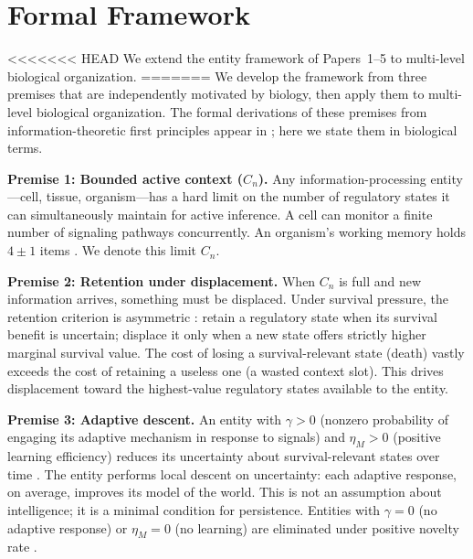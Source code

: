 \documentclass[11pt]{article}
\theoremstyle{definition}
\theoremstyle{remark}
\begin{document}
\section{Formal Framework}
\label{sec:framework}

<<<<<<< HEAD
We extend the entity framework of Papers~1--5 to multi-level
biological organization.
=======
We develop the framework from three premises that are independently
motivated by biology, then apply them to multi-level biological
organization. The formal derivations of these premises from
information-theoretic first principles appear in
\cite{McCarthy2026a, McCarthy2026b, McCarthy2026c, McCarthy2026d};
here we state them in biological terms.

\textbf{Premise 1: Bounded active context ($C_n$).}
Any information-processing entity---cell, tissue, organism---has a
hard limit on the number of regulatory states it can simultaneously
maintain for active inference. A cell can monitor a finite number of
signaling pathways concurrently. An organism's working memory holds
$4 \pm 1$ items \cite{Cowan2001}. We denote this limit $C_n$.

\textbf{Premise 2: Retention under displacement.}
When $C_n$ is full and new information arrives, something must be
displaced. Under survival pressure, the retention criterion is
asymmetric \cite{McCarthy2026c}: retain a regulatory state when its
survival benefit is uncertain; displace it only when a new state
offers strictly higher marginal survival value. The cost of losing a
survival-relevant state (death) vastly exceeds the cost of retaining
a useless one (a wasted context slot). This drives displacement
toward the highest-value regulatory states available to the entity.

\textbf{Premise 3: Adaptive descent.}
An entity with $\gamma > 0$ (nonzero probability of engaging its
adaptive mechanism in response to signals) and $\eta_M > 0$
(positive learning efficiency) reduces its uncertainty about
survival-relevant states over time \cite{McCarthy2026d}. The entity
performs local descent on uncertainty: each adaptive response, on
average, improves its model of the world. This is not an assumption
about intelligence; it is a minimal condition for persistence. Entities
with $\gamma = 0$ (no adaptive response) or $\eta_M = 0$ (no
learning) are eliminated under positive novelty rate
\cite{McCarthy2026d}.
\end{document}
